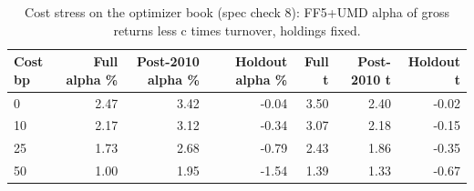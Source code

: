 \begin{table}[htbp]
\centering
\footnotesize
\caption{Cost stress on the optimizer book (spec check 8): FF5+UMD alpha of gross returns less c times turnover, holdings fixed.}
\label{tab:m7_cost}
\begin{tabular}{lrrrrrr}
\toprule
Cost bp & Full alpha \% & Post-2010 alpha \% & Holdout alpha \% & Full t & Post-2010 t & Holdout t \\
\midrule
0 & 2.47 & 3.42 & -0.04 & 3.50 & 2.40 & -0.02 \\
10 & 2.17 & 3.12 & -0.34 & 3.07 & 2.18 & -0.15 \\
25 & 1.73 & 2.68 & -0.79 & 2.43 & 1.86 & -0.35 \\
50 & 1.00 & 1.95 & -1.54 & 1.39 & 1.33 & -0.67 \\
\bottomrule
\end{tabular}
\par{}
\end{table}
